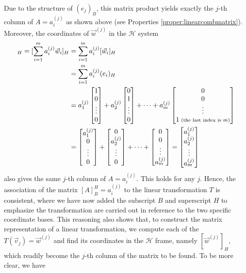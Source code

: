 Due to the structure of $(e_j)_B$, this matrix product yields exactly the $j$-th column of $A = a_i^{(j)}$ as shown above (see Properties \ref{proper:linearcombmatrix}). Moreover, the coordinates of $\vec{w}^{(j)}$ in the $\mathcal{H}$ system
\begin{align*}
[\vec{w}^{(j)}]_H = [\sum_{i=1}^{m} a_i^{(j)}\vec{w}_i]_H &= \sum_{i=1}^{m} a_i^{(j)}[\vec{w}_i]_H \\
&= \sum_{i=1}^{m} a_i^{(j)}(e_i)_H \\
&=  a_1^{(j)} \begin{bmatrix}
1 \\
0 \\
\vdots \\
0
\end{bmatrix}
+
a_2^{(j)} \begin{bmatrix}
0 \\
1 \\
\vdots \\
0
\end{bmatrix}
+ \cdots
+
a_m^{(j)} \begin{bmatrix}
0 \\
0 \\
\vdots \\
1 {\scriptsize \text{ (the last index is $m$)}}
\end{bmatrix}
\\
&= \begin{bmatrix}
a_1^{(j)} \\
0 \\
\vdots \\
0
\end{bmatrix}
+
\begin{bmatrix}
0 \\
a_2^{(j)} \\
\vdots \\
0
\end{bmatrix}
+ \cdots
+
\begin{bmatrix}
0 \\
0 \\
\vdots \\
a_m^{(j)}
\end{bmatrix}
=
\begin{bmatrix}
a_1^{(j)} \\
a_2^{(j)} \\
\vdots \\
a_m^{(j)}
\end{bmatrix}
\end{align*}
also gives the same $j$-th column of $A = a_i^{(j)}$. This holds for any $j$. Hence, the association of the matrix $[A]_B^H = a_i^{(j)}$ to the linear transformation $T$ is consistent, where we have now added the subscript $B$ and superscript $H$ to emphasize the transformation are carried out in reference to the two specific coordinate bases. This reasoning also shows that, to construct the matrix representation of a linear transformation, we compute each of the $T(\vec{v}_j) = \vec{w}^{(j)}$ and find its coordinates in the $\mathcal{H}$ frame, namely $[\vec{w}^{(j)}]_H$, which readily become the $j$-th column of the matrix to be found. To be more clear, we have
